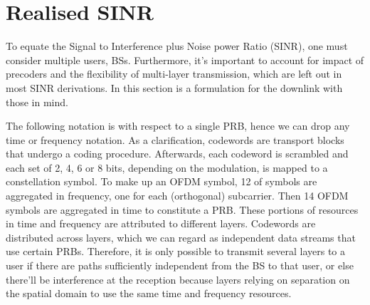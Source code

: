 \section{Realised SINR}
\label{sec:realisedsinr}

To equate the Signal to Interference plus Noise power Ratio (\acs{SINR}), one must consider multiple users, \acp{BS}. Furthermore, it's important to account for impact of precoders and the flexibility of multi-layer transmission, which are left out in most \acs{SINR} derivations. In this section is a formulation for the downlink with those in mind.

The following notation is with respect to a single \acs{PRB}, hence we can drop any time or frequency notation.
As a clarification, codewords are transport blocks that undergo a coding procedure. Afterwards, each codeword is scrambled and each set of 2, 4, 6 or 8 bits, depending on the modulation, is mapped to a constellation symbol. To make up an \acs{OFDM} symbol, 12 of symbols are aggregated in frequency, one for each (orthogonal) subcarrier. Then 14 \acs{OFDM} symbols are aggregated in time to constitute a \acl{PRB}. These portions of resources in time and frequency are attributed to different layers. Codewords are distributed across layers, which we can regard as independent data streams that use certain \acsp{PRB}. Therefore, it is only possible to transmit several layers to a user if there are paths sufficiently independent from the \acs{BS} to that user, or else there'll be interference at the reception because layers relying on separation on the spatial domain to use the same time and frequency resources.

